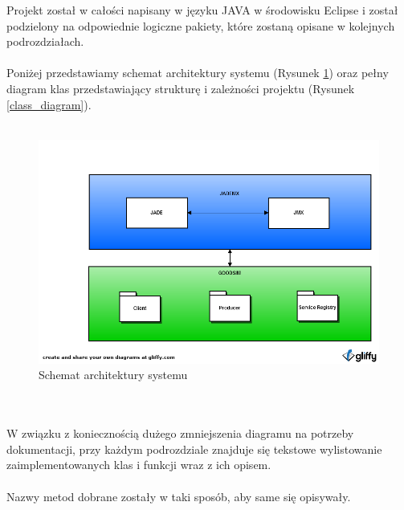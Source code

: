 \documentclass[a4paper,12pt]{article}
\begin{document}
Projekt został w całości napisany w języku JAVA w środowisku Eclipse i został podzielony na odpowiednie logiczne pakiety, które zostaną opisane w kolejnych podrozdziałach.
\\ \\
Poniżej przedstawiamy schemat architektury systemu (Rysunek \ref{schemat}) oraz pełny diagram klas przedstawiający strukturę i zależności projektu (Rysunek \ref{class_diagram}).
\\ \\
\begin{figure}[!h]
\centering
\includegraphics[scale=0.5]{gfx/goodsim.png}
\caption{Schemat architektury systemu}
\label{schemat}
\end{figure}
\\ \\
W związku z koniecznością dużego zmniejszenia diagramu na potrzeby dokumentacji, przy każdym podrozdziale znajduje się tekstowe wylistowanie zaimplementowanych klas i funkcji wraz z ich opisem.
\\ \\
Nazwy metod dobrane zostały w taki sposób, aby same się opisywały.
\end{document}
